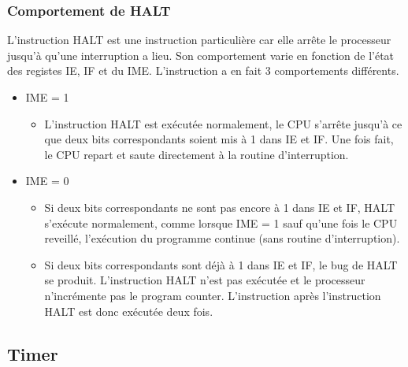 \documentclass[a4paper]{article}
\begin{document}
\subsubsection{Comportement de HALT}
L'instruction HALT est une instruction particulière car elle arrête le processeur
jusqu'à qu'une interruption a lieu. Son comportement varie en fonction de l'état
des registes IE, IF et du IME. L'instruction a en fait 3 comportements
différents.
\begin{itemize}[label=\textbullet]
	\item IME = 1
	\begin{itemize}[label=\textbullet]
		\item L'instruction HALT est exécutée normalement, le CPU s'arrête jusqu'à
		ce que deux bits correspondants soient mis à 1 dans IE et IF. Une fois fait,
		le CPU repart et saute directement à la routine d'interruption.
	\end{itemize}
	\item IME = 0
	\begin{itemize}[label=\textbullet]
		\item Si deux bits correspondants ne sont pas encore à 1 dans IE et IF, HALT 
		s'exécute normalement, comme lorsque IME = 1 sauf qu'une fois le CPU reveillé,
		l'exécution du programme continue (sans routine d'interruption).
		\item Si deux bits correspondants sont déjà à 1 dans IE et IF, le bug de HALT
		se produit. L'instruction HALT n'est pas exécutée et le processeur n'incrémente
		pas le program counter. L'instruction après l'instruction HALT est donc exécutée
		deux fois.
	\end{itemize}
\end{itemize}


\subsection{Timer}
\end{document}
